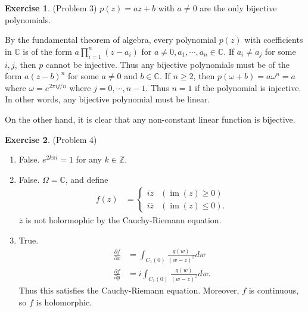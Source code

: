 \documentclass[12pt, psamsfonts]{amsart}
\theoremstyle{definition}
\newtheorem*{exer}{Exercise}
\theoremstyle{remark}
\DeclareMathOperator{\im}{im}
\numberwithin{equation}{section}
\begin{document}
\begin{exer}{(Problem 3)}
  $p(z) = az + b$ with $a \ne 0$ are the only bijective polynomials.

  By the fundamental theorem of algebra, every polynomial $p(z)$ with coefficients in $\mathbb{C}$ is of the form $a\prod_{i=1}^{n}(z - a_i)$ for $a \ne 0, a_1, \cdots, a_n \in \mathbb{C}$.
  If $a_i \ne a_j$ for some $i, j$, then $p$ cannot be injective.
  Thus any bijective polynomials must be of the form $a(z - b)^n$ for some $a \ne 0$ and $b \in \mathbb{C}$.
  If $n \geq 2$, then $p(\omega + b) = a\omega^n = a$ where $\omega = e^{2\pi i j / n}$ where $j = 0, \cdots, n - 1$.
  Thus $n = 1$ if the polynomial is injective.
  In other words, any bijective polynomial must be linear.

  On the other hand, it is clear that any non-constant linear function is bijective.
\end{exer}

\begin{exer}{(Problem 4)}
 $ $
  \begin{enumerate}[label=(\alph*)]
    \item 
      False. $e^{2k\pi i} = 1$ for any $k \in \mathbb{Z}$.
    \item
      False. $\Omega = \mathbb{C}$, and define
      \begin{align*}
        f(z) &= \begin{cases}
          iz & (\im(z) \geq 0) \\
          i\overline{z} & (\im(z) \leq 0).
        \end{cases}
      \end{align*}
      $\overline{z}$ is not holormophic by the Cauchy-Riemann equation.
    \item
      True.
      \begin{align*}
        \frac{\partial f}{\partial x} &= \int_{C_1(0)} \frac{g(w)}{(w - z)^2} dw \\
        \frac{\partial f}{\partial y} &= i\int_{C_1(0)} \frac{g(w)}{(w - z)^2} dw.
      \end{align*}
      Thus this satisfies the Cauchy-Riemann equation.
      Moreover, $f$ is continuous, so $f$ is holomorphic.
  \end{enumerate}
\end{exer}
\end{document}
